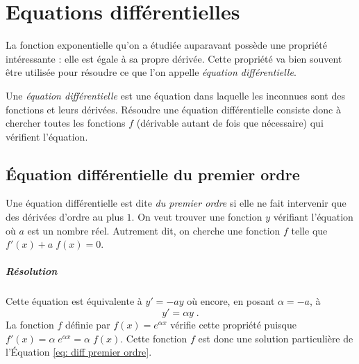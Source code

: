 
\TCDLessonStyleOn
\providecommand{\mampiditratext}[1]{}
\chapter{Equations diff\'erentielles}
	      La fonction exponentielle qu'on a \'etudi\'ee auparavant poss\`ede une propri\'et\'e int\'eressante : 
	      elle est \'egale \`a sa propre d\'eriv\'ee.
      Cette propri\'et\'e va bien souvent \^etre utilis\'ee pour r\'esoudre ce que l'on appelle 
      \emph{\'equation diff\'erentielle}.
      \begin{defi}
      Une \emph{\'equation diff\'erentielle} est une \'equation dans laquelle 
	      les inconnues sont des fonctions et leurs d\'eriv\'ees.
	      R\'esoudre une \'equation diff\'erentielle consiste donc \`a chercher toutes les fonctions $f$ 
      (d\'erivable autant de fois que n\'ecessaire) qui v\'erifient l'\'equation.
      \end{defi}
	            \section{\'Equation diff\'erentielle du premier ordre} 
	            Une \'equation diff\'erentielle est dite \emph{du premier ordre} 
            si elle ne fait intervenir que des d\'eriv\'ees d'ordre au plus $1$.
            On veut trouver une fonction $y$ v\'erifiant l'\'equation 
             o\`u $a$ est un nombre r\'eel.
            Autrement dit, on cherche une fonction $f$ telle que ${f'(x) + a \; f(x) = 0}$.
            \paragraph{R\'esolution}
                  Cette \'equation est \'equivalente \`a $y' = - a y$ o\`u encore, en posant $\alpha = -a$, \`a 
                  \begin{equation}
                  \label{eq: diff premier ordre}
                  y' = \alpha y \; .
                  \end{equation}
                  La fonction $f$ d\'efinie par $f(x) = e^{\alpha x}$ v\'erifie cette propri\'et\'e 
                  puisque $f'(x) = \alpha \; e^{\alpha x} = \alpha \; f(x)$. 
                  Cette fonction $f$ est donc une solution particuli\`ere de l'\'Equation \ref{eq: diff premier ordre}.
                  
